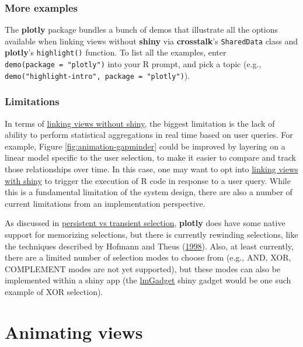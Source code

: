 \documentclass[12pt,]{isuthesis}
\begin{document}
\subsubsection{More examples}\label{more-examples}

The \textbf{plotly} package bundles a bunch of demos that illustrate all
the options available when linking views without \textbf{shiny} via
\textbf{crosstalk}'s \texttt{SharedData} class and \textbf{plotly}'s
\texttt{highlight()} function. To list all the examples, enter
\texttt{demo(package\ =\ "plotly")} into your R prompt, and pick a topic
(e.g., \texttt{demo("highlight-intro",\ package\ =\ "plotly")}).

\hypertarget{limitations}{\subsubsection{Limitations}\label{limitations}}

In terms of \protect\hyperlink{linking-views-without-shiny}{linking
views without shiny}, the biggest limitation is the lack of ability to
perform statistical aggregations in real time based on user queries. For
example, Figure \ref{fig:animation-gapminder} could be improved by
layering on a linear model specific to the user selection, to make it
easier to compare and track those relationships over time. In this case,
one may want to opt into
\protect\hyperlink{linking-views-without-shiny}{linking views with
shiny} to trigger the execution of R code in response to a user query.
While this is a fundamental limitation of the system design, there are
also a number of current limitations from an implementation perspective.

As discussed in
\protect\hyperlink{transient-versus-persistent-selection}{persistent vs
transient selection}, \textbf{plotly} does have some native support for
memorizing selections, but there is currently rewinding selections, like
the techniques described by Hofmann and Theus
(\protect\hyperlink{ref-selection-sequences}{1998}). Also, at least
currently, there are a limited number of selection modes to choose from
(e.g., AND, XOR, COMPLEMENT modes are not yet supported), but these
modes can also be implemented within a shiny app (the
\href{https://github.com/ropensci/plotly/blob/cd93ab303efa56007b8bba725bab140e8a8aae39/inst/examples/lmGadget/app.R}{lmGadget}
shiny gadget would be one such example of XOR selection).

\hypertarget{animating-views}{\section{Animating
views}\label{animating-views}}
\end{document}
